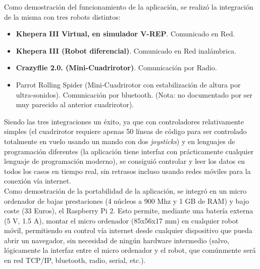 Como demostración del funcionamiento de la aplicación, se realizó la integración de la misma con tres robots distintos:
\begin{itemize}
	\item \textbf{Khepera III Virtual, en simulador V-REP}. Comunicado en Red.
	\item \textbf{Khepera III (Robot diferencial)}. Comunicado en Red inalámbrica.
	\item \textbf{Crazyflie 2.0. (Mini-Cuadrirotor)}. Comunicación por Radio.
	\item Parrot Rolling Spider (Mini-Cuadrirotor con estabilización de altura por ultra-sonidos). Comunicación por bluetooth. 
	(Nota: no documentado por ser muy parecido al anterior cuadrirotor).
\end{itemize}

Siendo las tres integraciones un éxito, ya que con controladores relativamente simples (el cuadrirotor requiere apenas 50 líneas 
de código para ser controlado totalmente en vuelo usando un mando con dos \textit{joysticks}) y en lenguajes de programación 
diferentes (la aplicación tiene interfaz con prácticamente cualquier lenguaje de programación moderno), se consiguió controlar y 
leer los datos en todos los casos en tiempo real, sin retrasos incluso usando redes móviles para la conexión vía internet.\\

Como demostración de la portabilidad de la aplicación, se integró en un micro ordenador de bajas prestaciones (4 núcleos a 900 
Mhz y 1 GB de RAM) y bajo coste (33 Euros), el Raspberry Pi 2. Esto permite, mediante una batería externa (5 V, 1.5 A), montar el 
micro ordenador (85x56x17 mm) en cualquier robot móvil, permitiendo su control vía internet desde cualquier dispositivo que pueda 
abrir un navegador, sin necesidad de ningún hardware intermedio (salvo, lógicamente la interfaz entre el micro ordenador y el 
robot, que comúnmente será en red TCP/IP, bluetooth, radio, serial, etc.).\\

